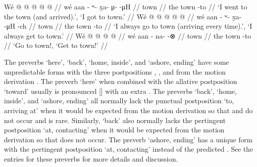 \pex\label{ex:inventory-preverb-F-rest}%
\a\label{ex:inventory-preverb-F-rest-pfv}%
%
\begingl
	\gla	Wé  @ {}  @ {} @ {} @ {} @ {} //
	\glb	wé aan - ʷ- x̱a- μ-  -μH //
	\glc	{} town \· \· \· \·  \· //
	\gld	the town -to  {} {} {} {} //
	\glft	‘I went to the town (and arrived).’, ‘I got to town.’
		//
\endgl
\a\label{ex:inventory-preverb-F-rest-hab}%
%
\begingl
	\gla	Wé  @ {}  @ {} @ {} @ {} @ {} //
	\glb	wé aan - ʷ- x̱a-  -μH -ch //
	\glc	{} town \· \· \· \·  \· //
	\gld	the town -to  {} {} {} {} //
	\glft	‘I always go to town (arriving every time).’, ‘I always get to town.’
		//
\endgl
\a\label{ex:inventory-preverb-F-rest-imp}%
%
\begingl
	\gla	Wé  @ {}  @ {} @ {} @ {} //
	\glb	wé aan - na- {}  -⊗ //
	\glc	{} town \· \· \·  \· //
	\gld	the town -to  {} {} {} //
	\glft	‘Go to town!, ‘Get to town!’
		//
\endgl
\xe

The preverbs  ‘here’,  ‘back’,  ‘home, inside’,
	and  ‘ashore, ending’ have some unpredictable forms
	with the three postpositions , , and 
	from the motion derivation .
The preverb  ‘here’ when combined with the allative postposition  ‘toward’
	usually is pronounced  [] with an extra .
The preverbs  ‘back’,  ‘home, inside’, and  ‘ashore, ending’
	all normally lack the punctual postposition  ‘to, arriving at’
	when it would be expected from the  motion derivation
	so that  and  do not occur and  is rare.
Similarly,  ‘back’ also normally lacks the pertingent postposition  ‘at, contacting’
	when it would be expected from the  motion derivation
	so that  does not occur.
The preverb  ‘ashore, ending’ has a unique form 
	with the pertingent postposition  ‘at, contacting’
	instead of the predicted .
See the entries for these preverbs for more details and discussion.

